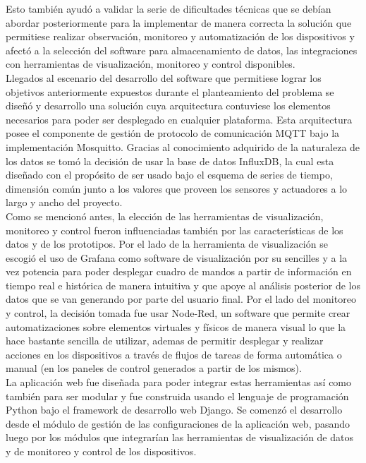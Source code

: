 Esto también ayudó a validar la serie de dificultades técnicas que se debían abordar posteriormente para la implementar de manera correcta la solución que permitiese realizar observación, monitoreo y automatización de los dispositivos y afectó a la selección del software para almacenamiento de datos, las integraciones con herramientas de visualización, monitoreo y control disponibles.\\

Llegados al escenario del desarrollo del software que permitiese lograr los objetivos anteriormente expuestos durante el planteamiento del problema se diseñó y desarrollo una solución cuya arquitectura contuviese los elementos necesarios para poder ser desplegado en cualquier plataforma. Esta arquitectura posee el componente de gestión de protocolo de comunicación MQTT bajo la implementación Mosquitto. Gracias al conocimiento adquirido de la naturaleza de los datos se tomó la decisión de usar la base de datos InfluxDB, la cual esta diseñado con el propósito de ser usado bajo el esquema de series de tiempo, dimensión común junto a los valores que proveen los sensores y actuadores a lo largo y ancho del proyecto.\\

Como se mencionó antes, la elección de las herramientas de visualización, monitoreo y control fueron influenciadas también por las características de los datos y de los prototipos. Por el lado de la herramienta de visualización se escogió el uso de Grafana como software de visualización por su sencilles y a la vez potencia para poder desplegar cuadro de mandos a partir de información en tiempo real e histórica de manera intuitiva y que apoye al análisis posterior de los datos que se van generando por parte del usuario final. Por el lado del monitoreo y control, la decisión tomada fue usar Node-Red, un software que permite crear automatizaciones sobre elementos virtuales y físicos de manera visual lo que la hace bastante sencilla de utilizar, ademas de permitir desplegar y realizar acciones en los dispositivos a través de flujos de tareas de forma automática o manual (en los paneles de control  generados a partir de los mismos).\\

La aplicación web fue diseñada para poder integrar estas herramientas así como también para ser modular y fue construida usando el lenguaje de programación Python bajo el framework de desarrollo web Django. Se comenzó el desarrollo desde el módulo de gestión de las configuraciones de la aplicación web, pasando luego por los módulos que integrarían las herramientas de visualización de datos y de monitoreo y control de los dispositivos.\\

